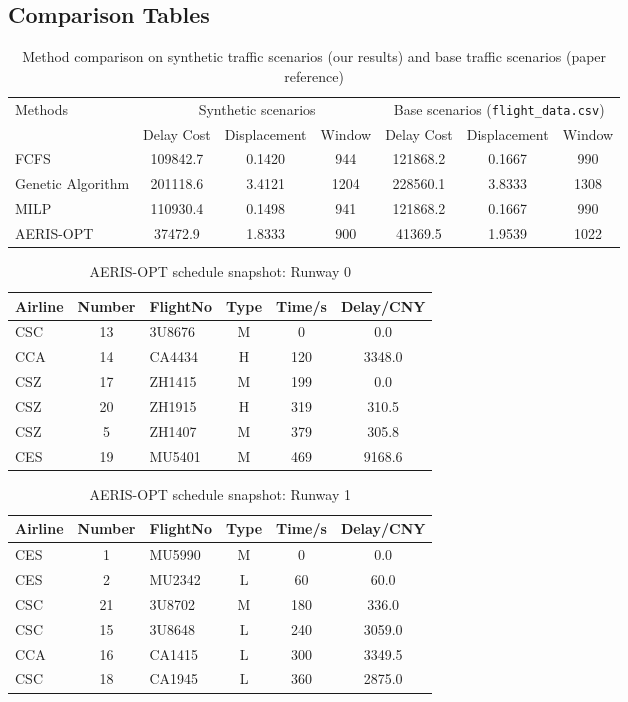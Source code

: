 \documentclass[conference]{IEEEtran}
\begin{document}
\subsection{Comparison Tables}
\begin{table}[t]
\centering
\caption{Method comparison on synthetic traffic scenarios (our results) and base traffic scenarios (paper reference)}
\small
\begin{tabular}{lcccccc}
\toprule
Methods & \multicolumn{3}{c}{Synthetic scenarios} & \multicolumn{3}{c}{Base scenarios (\texttt{flight\_data.csv})} \\
\cmidrule(lr){2-4}\cmidrule(lr){5-7}
 & Delay Cost & Displacement & Window & Delay Cost & Displacement & Window \\
\midrule
FCFS & 109842.7 & 0.1420 & 944 & 121868.2 & 0.1667 & 990 \\
Genetic Algorithm & 201118.6 & 3.4121 & 1204 & 228560.1 & 3.8333 & 1308 \\
MILP & 110930.4 & 0.1498 & 941 & 121868.2 & 0.1667 & 990 \\
AERIS-OPT & 37472.9 & 1.8333 & 900 & 41369.5 & 1.9539 & 1022 \\
\bottomrule
\end{tabular}
\label{tab:imagecomp}
\end{table}

\begin{table}[t]
\centering
\caption{AERIS-OPT schedule snapshot: Runway 0}
\scriptsize
\begin{tabular}{l c l c c c}
\toprule
Airline & Number & FlightNo & Type & Time/s & Delay/CNY \\
\midrule
CSC & 13 & 3U8676 & M & 0 & 0.0 \\
CCA & 14 & CA4434 & H & 120 & 3348.0 \\
CSZ & 17 & ZH1415 & M & 199 & 0.0 \\
CSZ & 20 & ZH1915 & H & 319 & 310.5 \\
CSZ & 5 & ZH1407 & M & 379 & 305.8 \\
CES & 19 & MU5401 & M & 469 & 9168.6 \\
\bottomrule
\end{tabular}
\label{tab:extra_schedule_r0}
\end{table}

\begin{table}[t]
\centering
\caption{AERIS-OPT schedule snapshot: Runway 1}
\scriptsize
\begin{tabular}{l c l c c c}
\toprule
Airline & Number & FlightNo & Type & Time/s & Delay/CNY \\
\midrule
CES & 1 & MU5990 & M & 0 & 0.0 \\
CES & 2 & MU2342 & L & 60 & 60.0 \\
CSC & 21 & 3U8702 & M & 180 & 336.0 \\
CSC & 15 & 3U8648 & L & 240 & 3059.0 \\
CCA & 16 & CA1415 & L & 300 & 3349.5 \\
CSC & 18 & CA1945 & L & 360 & 2875.0 \\
\bottomrule
\end{tabular}
\label{tab:extra_schedule_r1}
\end{table}
\end{document}
